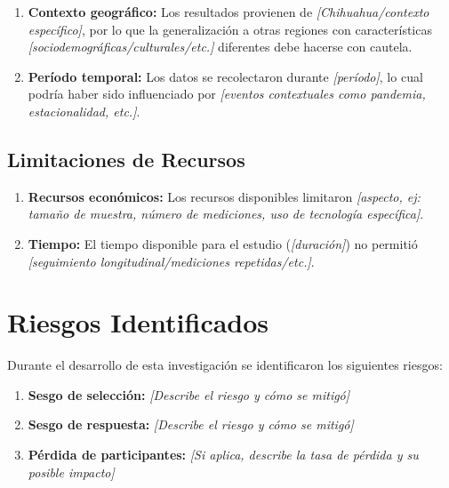 \begin{enumerate}
    \item \textbf{Contexto geográfico:} Los resultados provienen de \textit{{[Chihuahua/contexto específico]}}, por lo que la generalización a otras regiones con características \textit{{[sociodemográficas/culturales/etc.]}} diferentes debe hacerse con cautela.
    
    \item \textbf{Período temporal:} Los datos se recolectaron durante \textit{{[período]}}, lo cual podría haber sido influenciado por \textit{{[eventos contextuales como pandemia, estacionalidad, etc.]}}.
\end{enumerate}

\subsection{Limitaciones de Recursos}
\label{subsec:limitaciones_recursos}

\begin{enumerate}
    \item \textbf{Recursos económicos:} Los recursos disponibles limitaron \textit{{[aspecto, ej: tamaño de muestra, número de mediciones, uso de tecnología específica]}}.
    
    \item \textbf{Tiempo:} El tiempo disponible para el estudio (\textit{{[duración]}}) no permitió \textit{{[seguimiento longitudinal/mediciones repetidas/etc.]}}.
\end{enumerate}

\section{Riesgos Identificados}
\label{sec:riesgos}

Durante el desarrollo de esta investigación se identificaron los siguientes riesgos:

\begin{enumerate}
    \item \textbf{Sesgo de selección:} \textit{{[Describe el riesgo y cómo se mitigó]}}
    
    \item \textbf{Sesgo de respuesta:} \textit{{[Describe el riesgo y cómo se mitigó]}}
    
    \item \textbf{Pérdida de participantes:} \textit{{[Si aplica, describe la tasa de pérdida y su posible impacto]}}
\end{enumerate}

